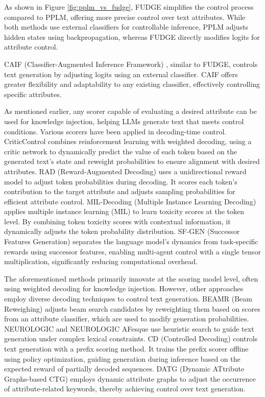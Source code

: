 \documentclass[acmsmall, screen]{acmart}
\begin{document}
As shown in Figure \ref{fig:pplm_vs_fudge}, FUDGE simplifies the control process compared to PPLM, offering more precise control over text attributes. While both methods use external classifiers for controllable inference, PPLM adjusts hidden states using backpropagation, whereas FUDGE directly modifies logits for attribute control.

CAIF (Classifier-Augmented Inference Framework) \cite{sitdikov_arxiv22_CAIF}, similar to FUDGE, controls text generation by adjusting logits using an external classifier. CAIF offers greater flexibility and adaptability to any existing classifier, effectively controlling specific attributes.

As mentioned earlier, any scorer capable of evaluating a desired attribute can be used for knowledge injection, helping LLMs generate text that meets control conditions. Various scorers have been applied in decoding-time control.
CriticControl \cite{kim_acl23-CriticControl} combines reinforcement learning with weighted decoding, using a critic network to dynamically predict the value of each token based on the generated text's state and reweight probabilities to ensure alignment with desired attributes.
RAD (Reward-Augmented Decoding) \cite{deng_acl23_rad} uses a unidirectional reward model to adjust token probabilities during decoding. It scores each token's contribution to the target attribute and adjusts sampling probabilities for efficient attribute control.
MIL-Decoding (Multiple Instance Learning Decoding) \cite{zhang_acl23_MIL-Decoding} applies multiple instance learning (MIL) to learn toxicity scores at the token level. By combining token toxicity scores with contextual information, it dynamically adjusts the token probability distribution.
SF-GEN (Successor Features Generation) \cite{cao_arxiv23_SF-GEN} separates the language model's dynamics from task-specific rewards using successor features, enabling multi-agent control with a single tensor multiplication, significantly reducing computational overhead.

The aforementioned methods primarily innovate at the scoring model level, often using weighted decoding for knowledge injection. However, other approaches employ diverse decoding techniques to control text generation.
BEAMR (Beam Reweighing) \cite{landsman_acl22_beamr} adjusts beam search candidates by reweighting them based on scores from an attribute classifier, which are used to modify generation probabilities.
NEUROLOGIC \cite{lu_acl21_neurologic} and NEUROLOGIC AFesque \cite{lu_acl22-neurologic-AFesque} use heuristic search to guide text generation under complex lexical constraints.
CD (Controlled Decoding) \cite{mudgal_nips23_Controlled-Decoding} controls text generation with a prefix scoring method. It trains the prefix scorer offline using policy optimization, guiding generation during inference based on the expected reward of partially decoded sequences.
DATG (Dynamic ATtribute Graphs-based CTG) \cite{liang_arxiv24_DATG} employs dynamic attribute graphs to adjust the occurrence of attribute-related keywords, thereby achieving control over text generation.
\end{document}
